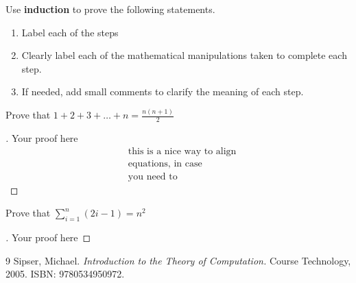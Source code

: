 \documentclass[12pt]{article}
\newenvironment{exercise}[2][Exercise]{\begin{trivlist}
\item[\hskip \labelsep {\bfseries #1}\hskip \labelsep {\bfseries #2.}]}{\end{trivlist}}
\newenvironment{solution}[1][{\color{red} Solution:}]{\begin{trivlist}
\item[\hskip \labelsep {\bfseries #1}\hskip \labelsep {\bfseries}]}{\end{trivlist}}
\begin{document}
\begin{exercise}{4} Use \textbf{induction} to prove the following statements.

\begin{tip}
    \begin{enumerate}
        \item Label each of the steps
        \item Clearly label each of the mathematical manipulations taken to complete each step.
        \item If needed, add small comments to clarify the meaning of each step.
    \end{enumerate}
\end{tip}

\begin{enumerate}[(a)]
	\item Prove that $1 + 2 + 3 + \dots + n = \frac{n(n+1)}{2}$
    \begin{solution} 
        \begin{proof}[\unskip\nopunct]
            Your proof here
            \begin{align*} 
            & \text{this is a nice way to align} \\
            & \text{equations, in case} \\
            & \text{you need to}
            \end{align*}
        \end{proof}
    \end{solution}

\item  Prove that $\sum^{n}_{i=1}(2i - 1) = n^2$


\begin{solution} 
        \begin{proof}[\unskip\nopunct]
            Your proof here
        \end{proof}
    \end{solution}
        
\end{enumerate}        
\end{exercise}

\vfill

\begin{thebibliography}{9}
Sipser, Michael. 
\textit{Introduction to the Theory of Computation.} 
Course Technology, 2005. ISBN: 9780534950972. 

\end{thebibliography}

 
\end{document}
